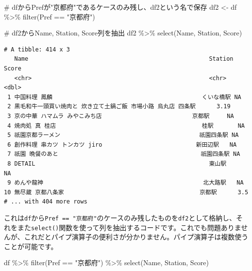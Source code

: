 \documentclass[
  a4paper,
  pandoc,
  ja=standard,
  jafont=haranoaji]{bxjsbook}
\newenvironment{Shaded}{\begin{snugshade}}{\end{snugshade}}
\newcommand{\CommentTok}[1]{\textcolor[rgb]{0.37,0.37,0.37}{#1}}
\newcommand{\FunctionTok}[1]{\textcolor[rgb]{0.28,0.35,0.67}{#1}}
\newcommand{\NormalTok}[1]{\textcolor[rgb]{0.00,0.48,0.65}{#1}}
\newcommand{\OtherTok}[1]{\textcolor[rgb]{0.00,0.48,0.65}{#1}}
\newcommand{\SpecialCharTok}[1]{\textcolor[rgb]{0.37,0.37,0.37}{#1}}
\newcommand{\StringTok}[1]{\textcolor[rgb]{0.13,0.47,0.30}{#1}}
\begin{document}
\begin{Shaded}
\begin{Highlighting}[numbers=left,,]
\CommentTok{\# dfからPrefが"京都府"であるケースのみ残し、df2という名で保存}
\NormalTok{df2 }\OtherTok{\textless{}{-}}\NormalTok{ df }\SpecialCharTok{\%\textgreater{}\%}
  \FunctionTok{filter}\NormalTok{(Pref }\SpecialCharTok{==} \StringTok{"京都府"}\NormalTok{)}

\CommentTok{\# df2からName, Station, Score列を抽出}
\NormalTok{df2 }\SpecialCharTok{\%\textgreater{}\%}
  \FunctionTok{select}\NormalTok{(Name, Station, Score)}
\end{Highlighting}
\end{Shaded}

\begin{verbatim}
# A tibble: 414 x 3
   Name                                                    Station    Score
   <chr>                                                   <chr>      <dbl>
 1 中国料理 鳳麟                                           くいな橋駅 NA   
 2 黒毛和牛一頭買い焼肉と 炊き立て土鍋ご飯 市場小路 烏丸店 四条駅      3.19
 3 京の中華 ハマムラ みやこみち店                          京都駅     NA   
 4 焼肉処 真 桂店                                          桂駅       NA   
 5 祇園京都ラーメン                                        祇園四条駅 NA   
 6 創作料理 串カツ トンカツ jiro                           新田辺駅   NA   
 7 祇園 晩餐のあと                                         祇園四条駅 NA   
 8 DETAIL                                                  東山駅     NA   
 9 めんや龍神                                              北大路駅   NA   
10 無尽蔵 京都八条家                                       京都駅      3.5 
# ... with 404 more rows
\end{verbatim}

これは\texttt{df}から\texttt{Pref\ ==\ "京都府"}のケースのみ残したものを\texttt{df2}として格納し、それをまた\texttt{select()}関数を使って列を抽出するコードです。これでも問題ありませんが、これだとパイプ演算子の便利さが分かりません。パイプ演算子は複数使うことが可能です。

\begin{Shaded}
\begin{Highlighting}[numbers=left,,]
\NormalTok{df }\SpecialCharTok{\%\textgreater{}\%}
  \FunctionTok{filter}\NormalTok{(Pref }\SpecialCharTok{==} \StringTok{"京都府"}\NormalTok{) }\SpecialCharTok{\%\textgreater{}\%}
  \FunctionTok{select}\NormalTok{(Name, Station, Score)}
\end{Highlighting}
\end{Shaded}
\end{document}
